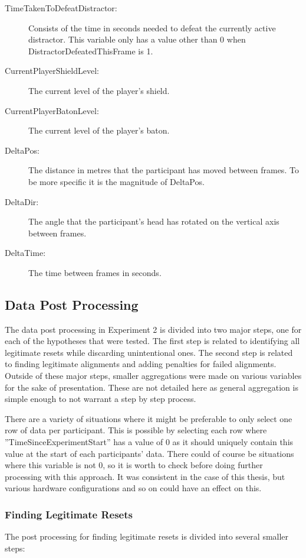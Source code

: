 \begin{description}
   \item[TimeTakenToDefeatDistractor:] Consists of the time in seconds needed to defeat the currently active distractor. This variable only has a value other than 0 when DistractorDefeatedThisFrame is 1. 
   \item[CurrentPlayerShieldLevel:] The current level of the player's shield. 
   \item[CurrentPlayerBatonLevel:] The current level of the player's baton. 
   \item[DeltaPos:] The distance in metres that the participant has moved between frames. To be more specific it is the magnitude of DeltaPos. 
   \item[DeltaDir:] The angle that the participant's head has rotated on the vertical axis between frames.
   \item[DeltaTime:] The time between frames in seconds.
\end{description}


\subsection{Data Post Processing}\label{sec:ex2postprocessingdetails}
The data post processing in Experiment 2 is divided into two major steps, one for each of the hypotheses that were tested. The first step is related to identifying all legitimate resets while discarding unintentional ones. The second step is related to finding legitimate alignments and adding penalties for failed alignments. Outside of these major steps, smaller aggregations were made on various variables for the sake of presentation. These are not detailed here as general aggregation is simple enough to not warrant a step by step process.
 
There are a variety of situations where it might be preferable to only select one row of data per participant. This is possible by selecting each row where ''TimeSinceExperimentStart'' has a value of 0 as it should uniquely contain this value at the start of each participants' data. There could of course be situations where this variable is not 0, so it is worth to check before doing further processing with this approach. It was consistent in the case of this thesis, but various hardware configurations and so on could have an effect on this.

\subsubsection{Finding Legitimate Resets}
The post processing for finding legitimate resets is divided into several smaller steps:

